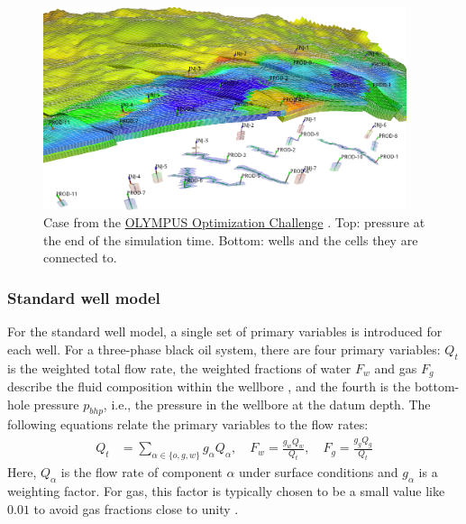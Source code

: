 \begin{figure}
  \centering
  \includegraphics[width=0.95\textwidth]{figures/olympus-pressure-wells}
  \caption{Case from the \href{http://ww.isapp2.com/optimization-challenge.html}{OLYMPUS
      Optimization Challenge} \citep{fonseca2018overview}. Top: pressure at the end of the
  simulation time. Bottom: wells and the cells they are connected to.}
\label{fig:olympus}
\end{figure}

\subsubsection{Standard well model}

For the standard well model, a single set of primary variables is introduced
for each well. For a three-phase black oil system, there are four primary
variables: $Q_t$ is the weighted total flow rate, the weighted
fractions of water $F_w$ and gas $F_g$ describe the fluid composition
within the wellbore \citep{holmes1983enhancements}, and the fourth is the
bottom-hole pressure $p_{bhp}$, i.e., the pressure in the wellbore
at the datum depth. The following equations relate
the primary variables to the flow rates:
\begin{align}
    Q_t &= \sum_{\alpha \in \{o, g, w\}} g_{\alpha} Q_{\alpha
          } \label{eq:weighted_total_rate}, \quad
    F_w = \frac{g_w Q_w}{Q_t}, \quad F_g = \frac{g_g Q_g}{Q_t}
\end{align}
Here, $Q_{\alpha}$ is the flow rate of component $\alpha$ under surface
conditions and $g_\alpha$ is a weighting factor. For gas, this factor
is typically chosen to be a small value like
$0.01$ to avoid gas fractions close to unity
\citep{holmes1983enhancements}.

